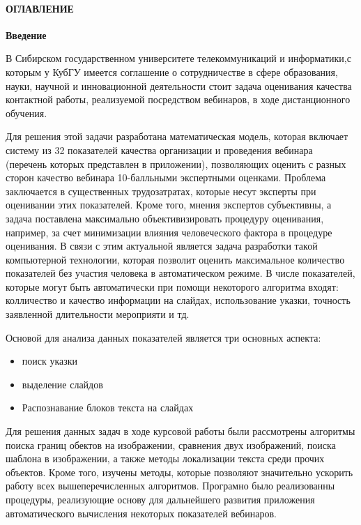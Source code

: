 \documentclass[oneside,final,14pt]{extreport}
\makeatletter
\renewcommand{\contentsname}%
    {ОГЛАВЛЕНИЕ}%
\renewcommand{\tableofcontents}{\paragraph*{\contentsname}\@starttoc{toc}}
\makeatother
\begin{document}
\tableofcontents
\newpage
\begin{center}
\bfseries Введение
\end{center}

	В Сибирском государственном университете телекоммуникаций и информатики,с которым у КубГУ имеется соглашение о сотрудничестве в сфере образования, науки, научной и инновационной деятельности стоит задача оценивания
качества контактной работы, реализуемой посредством вебинаров, в ходе дистанционного обучения. 

Для решения этой задачи разработана математическая модель, которая включает систему из 32 показателей качества организации и проведения вебинара (перечень которых представлен в приложении), позволяющих оценить с разных сторон  качество вебинара 10-балльными экспертными оценками. Проблема заключается в существенных трудозатратах, которые несут эксперты при оценивании этих показателей. Кроме того, мнения экспертов субъективны, а задача поставлена максимально объективизировать процедуру оценивания, например, за счет минимизации влияния человеческого фактора в процедуре оценивания. В связи с этим актуальной является  задача разработки такой компьютерной технологии, которая позволит оценить максимальное количество показателей без участия человека в автоматическом режиме. В числе показателей, которые могут быть автоматически при помощи некоторого алгоритма входят: колличество и качество информации на слайдах, использование указки, точность заявленной длительности мероприяти и тд.

Основой для анализа данных показателей является три основных аспекта:
\begin{itemize}[label= $-$, noitemsep]
\item поиск указки
\item выделение слайдов
\item Распознавание блоков текста на слайдах
\end{itemize}
 
Для решения данных задач в ходе курсовой работы были рассмотрены алгоритмы поиска границ обектов на изображении, сравнения двух изображений, поиска шаблона в изображении, а также методы локализации текста среди прочих объектов. Кроме того, изучены методы, которые позволяют значительно ускорить работу всех вышеперечисленных алгоритмов. Програмно было реализованны процедуры, реализующие основу для дальнейшего развития приложения автоматического вычисления некоторых показателей вебинаров. 
\end{document}
